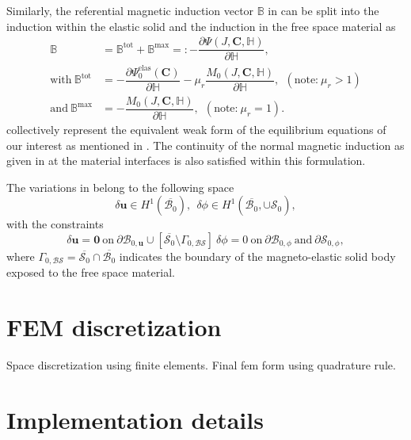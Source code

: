 \documentclass[11pt,a4paper,final]{article}
\begin{document}
Similarly, the referential magnetic induction vector $\mathbb{B}$ in  can be split into the induction within the elastic solid and the induction in the free space material as
\begin{align}
\mathbb{B} &= \mathbb{B}^{\text{tot}} + \mathbb{B}^{\text{max}} =: -\dfrac{\partial \Psi (J, \mathbf{C}, \mathbb{H})}{\partial \mathbb{H}}, \\
\text{with} \ \mathbb{B}^{\text{tot}} &= -\dfrac{\partial \Psi_0^{\text{elas}} (\mathbf{C})}{\partial \mathbb{H}} - \mu_r \dfrac{M_0 (J, \mathbf{C}, \mathbb{H})}{\partial \mathbb{H}}, \ \ (\text{note:} \ \mu_r > 1)\\
\text{and} \ \mathbb{B}^{\text{max}} &= -\dfrac{M_0 (J, \mathbf{C}, \mathbb{H})}{\partial \mathbb{H}}, \ \ (\text{note:} \ \mu_r = 1).
\end{align}
 collectively represent the equivalent weak form of the equilibrium equations of our interest as mentioned in . The continuity of the normal magnetic induction as given in  at the material interfaces is also satisfied within this formulation. \par 

\noindent The variations in  belong to the following space
\begin{equation}
\delta \mathbf{u} \in H^1 (\overline{\mathcal{B}_0}), \ \ \delta \phi \in H^1 (\overline{\mathcal{B}_0}, \cup \mathcal{S}_0),
\end{equation}
with the constraints 
\begin{equation}
\delta \mathbf{u} = \mathbf{0} \ \text{on} \ \partial \mathcal{B}_{0,\mathbf{u}} \cup \left[ \overline{\mathcal{S}_0} \setminus \Gamma_{0, \mathcal{BS}} \right] \ \delta \phi = 0 \ \text{on} \ \partial \mathcal{B}_{0,\phi} \ \text{and} \ \partial \mathcal{S}_{0,\phi},
\end{equation}
where $\Gamma_{0, \mathcal{BS}} = \overline{\mathcal{S}_0} \cap \overline{\mathcal{B}_0}$ indicates the boundary of the magneto-elastic solid body exposed to the free space material. 


\section{FEM discretization}
Space discretization using finite elements. Final fem form using quadrature rule. 

\section{Implementation details}
\end{document}
